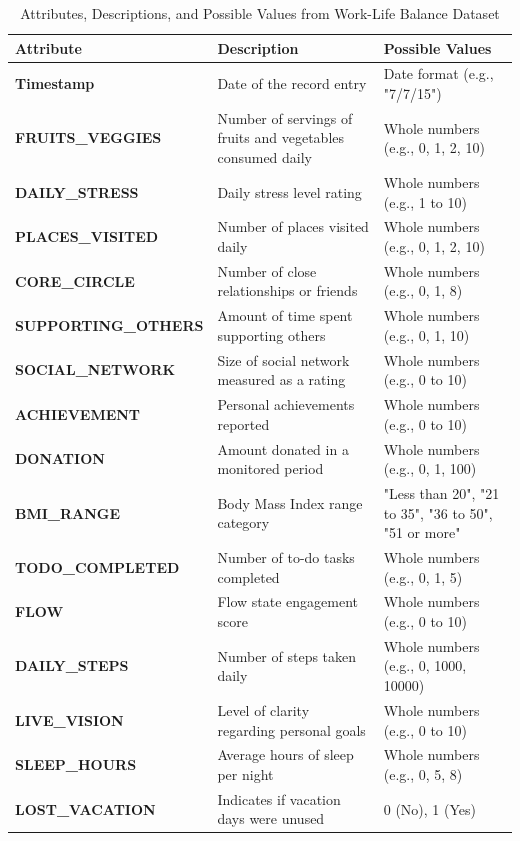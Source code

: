 \documentclass[runningheads]{llncs}
\begin{document}
\begin{enumerate}
\begin{table}[ht]
\centering
\caption{Attributes, Descriptions, and Possible Values from Work-Life Balance Dataset}
\label{tab:work_life_balance_attributes}
\begin{tabular}{|l|p{5cm}|p{4cm}|}
\hline
\textbf{Attribute} & \textbf{Description} & \textbf{Possible Values} \\ 
\hline
\textbf{Timestamp} & Date of the record entry & Date format (e.g., "7/7/15") \\ 
\hline
\textbf{FRUITS\_VEGGIES} & Number of servings of fruits and vegetables consumed daily & Whole numbers (e.g., 0, 1, 2, 10) \\ 
\hline
\textbf{DAILY\_STRESS} & Daily stress level rating & Whole numbers (e.g., 1 to 10) \\ 
\hline
\textbf{PLACES\_VISITED} & Number of places visited daily & Whole numbers (e.g., 0, 1, 2, 10) \\ 
\hline
\textbf{CORE\_CIRCLE} & Number of close relationships or friends & Whole numbers (e.g., 0, 1, 8) \\ 
\hline
\textbf{SUPPORTING\_OTHERS} & Amount of time spent supporting others & Whole numbers (e.g., 0, 1, 10) \\ 
\hline
\textbf{SOCIAL\_NETWORK} & Size of social network measured as a rating & Whole numbers (e.g., 0 to 10) \\ 
\hline
\textbf{ACHIEVEMENT} & Personal achievements reported & Whole numbers (e.g., 0 to 10) \\ 
\hline
\textbf{DONATION} & Amount donated in a monitored period & Whole numbers (e.g., 0, 1, 100) \\ 
\hline
\textbf{BMI\_RANGE} & Body Mass Index range category & "Less than 20", "21 to 35", "36 to 50", "51 or more" \\ 
\hline
\textbf{TODO\_COMPLETED} & Number of to-do tasks completed & Whole numbers (e.g., 0, 1, 5) \\ 
\hline
\textbf{FLOW} & Flow state engagement score & Whole numbers (e.g., 0 to 10) \\ 
\hline
\textbf{DAILY\_STEPS} & Number of steps taken daily & Whole numbers (e.g., 0, 1000, 10000) \\ 
\hline
\textbf{LIVE\_VISION} & Level of clarity regarding personal goals & Whole numbers (e.g., 0 to 10) \\ 
\hline
\textbf{SLEEP\_HOURS} & Average hours of sleep per night & Whole numbers (e.g., 0, 5, 8) \\ 
\hline
\textbf{LOST\_VACATION} & Indicates if vacation days were unused & 0 (No), 1 (Yes) \\ 

\end{tabular}
\end{table}
\end{enumerate}
\end{document}
